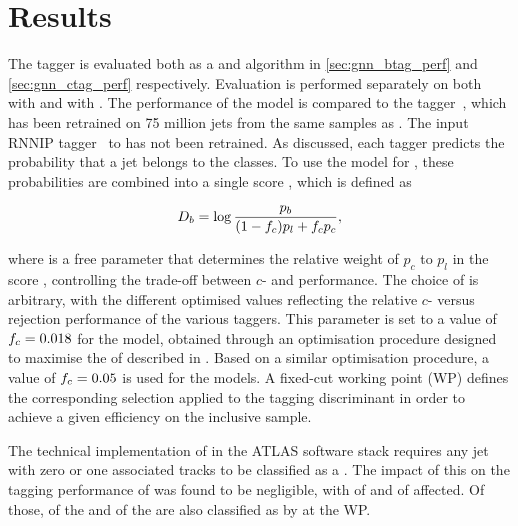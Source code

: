 \section{Results}\label{sec:gnn_results}


The \GNN tagger is evaluated both as a \btag and \ctag algorithm in \cref{sec:gnn_btag_perf} and \cref{sec:gnn_ctag_perf} respectively.
Evaluation is performed separately on both \ttbarjets with \ttbarpt and \Zprimejets with \Zprimept.
The performance of the model is compared to the \DLr tagger~\cite{ATL-PHYS-PUB-2017-013,ATLAS:2022qxm}, which has been retrained on 75 million jets from the same samples as \GNN.
The input RNNIP tagger~\cite{ATL-PHYS-PUB-2017-003} to \DLr has not been retrained.
As discussed, each tagger predicts the probability that a jet belongs to the \bcl classes.
To use the model for \btag, these probabilities are combined into a single score \Db, which is defined as

\begin{equation}\label{eq:btag-disc}
    \Db = \log{\frac{p_b}{(1-\fc )p_l + \fc  p_c}} ,
\end{equation}

where \fc is a free parameter that determines the relative weight of $p_c$ to $p_l$ in the score \Db, controlling the trade-off between $c$- and \lrej performance.
The choice of \fc is arbitrary, with the different optimised values reflecting the relative $c$- versus \ljet rejection performance of the various taggers.
This parameter is set to a value of $f_c = 0.018$ for the \DLr model, obtained through an optimisation procedure designed to maximise the \clrej of \DLr described in .
Based on a similar optimisation procedure, a value of $f_c = 0.05$ is used for the \GNN models.
A fixed-cut working point (WP) defines the corresponding selection applied to the tagging discriminant \Db in order to achieve a given efficiency on the inclusive \ttbar sample.

The technical implementation of \GNN in the ATLAS software stack requires any jet with zero or one associated tracks to be classified as a \ljet.
The impact of this on the tagging performance of \GNN was found to be negligible, with  of \ttbarbjets and  of \Zprimebjets affected.
Of those,  of the \ttbarbjets and  of the \Zprimebjets are also classified as \ljets by \DLr at the  \ttbar WP.

